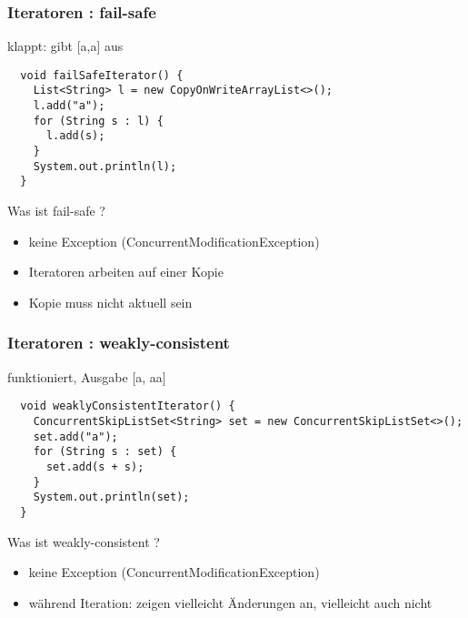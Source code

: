 \begin{frame}[fragile]
  \frametitle{Iteratoren : fail-safe}

klappt: gibt [a,a] aus
  \begin{lstlisting}
  void failSafeIterator() {
    List<String> l = new CopyOnWriteArrayList<>();
    l.add("a");
    for (String s : l) {
      l.add(s);
    }
    System.out.println(l);
  }
  \end{lstlisting}

  \begin{block}{Was ist fail-safe ?}
    \begin{itemize}
      \item keine Exception (ConcurrentModificationException)
      \item Iteratoren arbeiten auf einer Kopie
      \item Kopie muss nicht aktuell sein
    \end{itemize}
  \end{block}

\end{frame}
    
\begin{frame}[fragile]
  \frametitle{Iteratoren : weakly-consistent}

funktioniert, Ausgabe [a, aa]
  \begin{lstlisting}
  void weaklyConsistentIterator() {
    ConcurrentSkipListSet<String> set = new ConcurrentSkipListSet<>();
    set.add("a");
    for (String s : set) {
      set.add(s + s);
    }
    System.out.println(set);
  }
  \end{lstlisting}

  \begin{block}{Was ist weakly-consistent ?}
    \begin{itemize}
      \item keine Exception (ConcurrentModificationException)
      \item während Iteration: zeigen vielleicht Änderungen an, vielleicht auch nicht
    \end{itemize}
  \end{block}

\end{frame}
